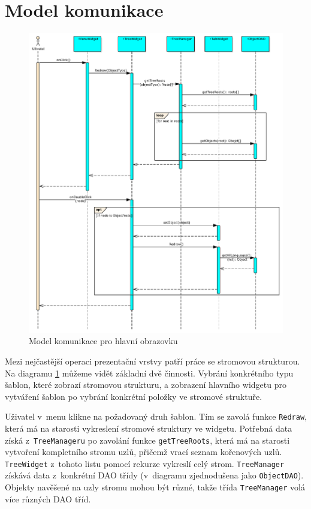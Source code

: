 \documentclass[thesis=B,czech]{resources/FITthesis}[2012/06/26]
\begin{document}
	\section{Model komunikace}
	\begin{figure}\centering
	\includegraphics[width=1\textwidth]{images/comunication_main}
	\caption[Model komunikace pro hlavní obrazovku]{Model komunikace pro hlavní obrazovku}\label{fig:comunication_main}
	\end{figure}
Mezi nejčastější operaci prezentační vrstvy patří práce se stromovou strukturou. Na diagramu \ref{fig:comunication_main} můžeme vidět základní dvě činnosti. Vybrání konkrétního typu šablon, které zobrazí stromovou strukturu, a zobrazení hlavního widgetu pro vytváření šablon po vybrání konkrétní položky ve stromové struktuře.\par

Uživatel v~menu klikne na požadovaný druh šablon. Tím se zavolá funkce \texttt{Redraw}, která má na starosti vykreslení stromové struktury ve widgetu. Potřebná data získá z~\texttt{TreeManageru} po zavolání funkce \texttt{getTreeRoots}, která má na starosti vytvoření kompletního stromu uzlů, přičemž vrací seznam kořenových uzlů. \texttt{TreeWidget} z~tohoto listu pomocí rekurze vykreslí celý strom. \texttt{TreeManager} získává data z~konkrétní DAO třídy (v~diagramu zjednodušena jako \texttt{ObjectDAO}). Objekty navěšené na uzly stromu mohou být různé, takže třída \texttt{TreeManager} volá více různých DAO tříd.\par
\end{document}
